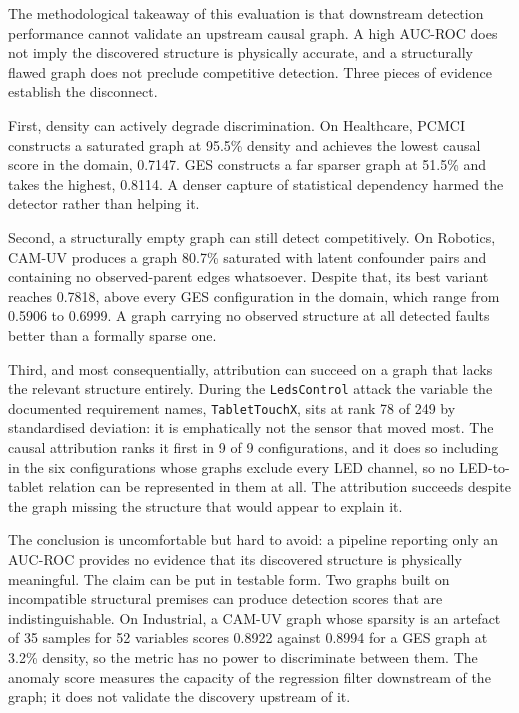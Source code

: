 The methodological takeaway of this evaluation is that downstream detection performance cannot validate an upstream causal graph. A high AUC-ROC does not imply the discovered structure is physically accurate, and a structurally flawed graph does not preclude competitive detection. Three pieces of evidence establish the disconnect.

First, density can actively degrade discrimination. On Healthcare, PCMCI constructs a saturated graph at 95.5\% density and achieves the lowest causal score in the domain, 0.7147. GES constructs a far sparser graph at 51.5\% and takes the highest, 0.8114. A denser capture of statistical dependency harmed the detector rather than helping it.

Second, a structurally empty graph can still detect competitively. On Robotics, CAM-UV produces a graph 80.7\% saturated with latent confounder pairs and containing no observed-parent edges whatsoever. Despite that, its best variant reaches 0.7818, above every GES configuration in the domain, which range from 0.5906 to 0.6999. A graph carrying no observed structure at all detected faults better than a formally sparse one.

Third, and most consequentially, attribution can succeed on a graph that lacks the relevant structure entirely. During the \texttt{LedsControl} attack the variable the documented requirement names, \texttt{TabletTouchX}, sits at rank 78 of 249 by standardised deviation: it is emphatically not the sensor that moved most. The causal attribution ranks it first in 9 of 9 configurations, and it does so including in the six configurations whose graphs exclude every LED channel, so no LED-to-tablet relation can be represented in them at all. The attribution succeeds despite the graph missing the structure that would appear to explain it.

The conclusion is uncomfortable but hard to avoid: a pipeline reporting only an AUC-ROC provides no evidence that its discovered structure is physically meaningful. The claim can be put in testable form. Two graphs built on incompatible structural premises can produce detection scores that are indistinguishable. On Industrial, a CAM-UV graph whose sparsity is an artefact of 35 samples for 52 variables scores 0.8922 against 0.8994 for a GES graph at 3.2\% density, so the metric has no power to discriminate between them. The anomaly score measures the capacity of the regression filter downstream of the graph; it does not validate the discovery upstream of it.


